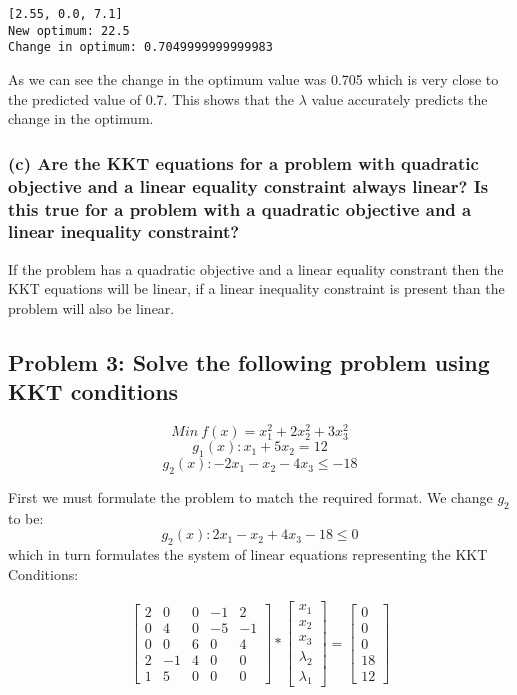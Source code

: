 \documentclass[11pt]{article}
\begin{document}
    \begin{Verbatim}[commandchars=\\\{\}]
[2.55, 0.0, 7.1]
New optimum: 22.5
Change in optimum: 0.7049999999999983

    \end{Verbatim}

    As we can see the change in the optimum value was 0.705 which is very
close to the predicted value of 0.7. This shows that the \(\lambda\)
value accurately predicts the change in the optimum.

    \subsubsection{(c) Are the KKT equations for a problem with quadratic
objective and a linear equality constraint always linear? Is this true
for a problem with a quadratic objective and a linear inequality
constraint?}\label{c-are-the-kkt-equations-for-a-problem-with-quadratic-objective-and-a-linear-equality-constraint-always-linear-is-this-true-for-a-problem-with-a-quadratic-objective-and-a-linear-inequality-constraint}

    If the problem has a quadratic objective and a linear equality constrant
then the KKT equations will be linear, if a linear inequality constraint
is present than the problem will also be linear.

    \subsection{Problem 3: Solve the following problem using KKT
conditions}\label{problem-3-solve-the-following-problem-using-kkt-conditions}

\[Min~f(x) = x_1^2 + 2x_2^2 + 3x_3^2\] \[g_1(x): x_1 + 5x_2 = 12\]
\[g_2(x): -2x_1-x_2 - 4x_3 \leq -18\]

    First we must formulate the problem to match the required format. We
change \(g_2\) to be: \[g_2(x): 2x_1 - x_2 + 4x_3 - 18 \leq 0\] which in
turn formulates the system of linear equations representing the KKT
Conditions:

\begin{align}
\begin{bmatrix}
 2&  0&  0&  -1& 2\\ 
 0&  4&  0&  -5& -1\\ 
 0&  0&  6&  0& 4\\ 
 2&  -1&  4&  0& 0\\ 
 1&  5&  0&  0& 0
\end{bmatrix} * 
\begin{bmatrix}
x_1 \\
x_2 \\
x_3 \\
\lambda_2 \\
\lambda_1 
\end{bmatrix} = 
\begin{bmatrix}
0\\0\\0\\18\\12
\end{bmatrix}
\end{align}
\end{document}
